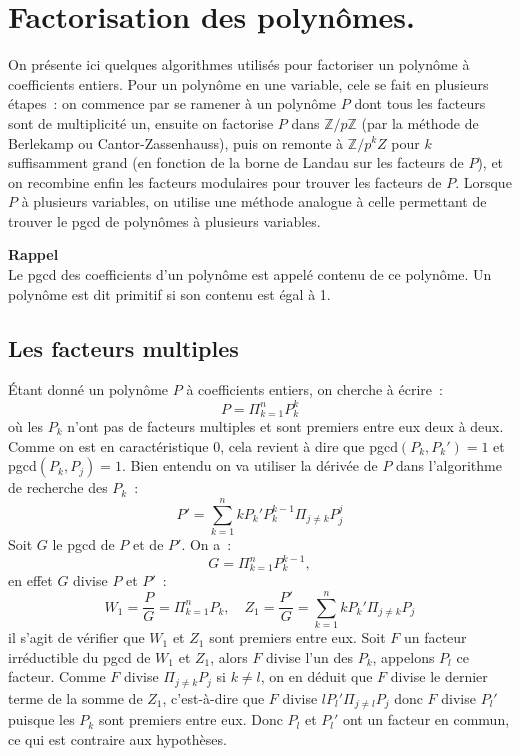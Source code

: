 \documentclass[a4paper,11pt]{article}
\newcommand{\Z}{{\mathbb{Z}}}
\begin{document}
\section{Factorisation des polynômes.} \label{sec:factor}

On présente ici quelques algorithmes utilisés pour factoriser un polynôme 
à coefficients entiers. 
Pour un polynôme en une variable,
cele se fait en plusieurs étapes~: on commence
par se ramener à un polynôme $P$ dont tous les facteurs sont de multiplicité
un, ensuite on factorise $P$ dans $\Z/p\Z$ (par la méthode de Berlekamp
ou Cantor-Zassenhauss), puis on remonte à $\Z/p^k Z$
pour $k$ suffisamment grand (en fonction de la borne de Landau sur les
facteurs de $P$), et on recombine enfin les facteurs modulaires pour
trouver les facteurs de $P$. Lorsque $P$ à plusieurs variables, on utilise
une méthode analogue à celle permettant de trouver le pgcd de polynômes
à plusieurs variables. 

{\bf Rappel}\\
Le pgcd des coefficients d'un polynôme est appelé contenu de ce polynôme.
Un polynôme est dit primitif si son contenu est égal à 1.

\subsection{Les facteurs multiples}  
\'Etant donné un polynôme $P$ à coefficients entiers, on cherche à 
écrire~:
\[ P=\Pi_{k=1}^n P_k^k \]
où les $P_k$ n'ont pas de facteurs multiples et sont premiers entre
eux deux à deux. Comme on est en
caractéristique 0, cela revient à dire que pgcd$(P_k,P_k')=1$
et pgcd$(P_k,P_j)=1$. Bien entendu
on va utiliser la dérivée de $P$ dans l'algorithme de recherche des $P_k$~:
\[ P'=\sum_{k=1}^n kP_k' P_k^{k-1} \Pi_{j\neq k} P_j^j \]
Soit $G$ le pgcd de $P$ et de $P'$. On a~:
\[ G=\Pi_{k=1}^n P_k^{k-1}, \]
en effet $G$ divise $P$ et $P'$~:
\[ W_1=\frac{P}{G}=\Pi_{k=1}^n P_k, \quad 
Z_1=\frac{P'}{G}=\sum_{k=1}^n kP_k'\Pi_{j\neq k} P_j \]
il s'agit de vérifier que $W_1$ et $Z_1$ sont premiers entre eux. Soit $F$ un
facteur irréductible du pgcd de $W_1$ et $Z_1$, alors $F$ divise l'un des 
$P_k$,
appelons $P_l$ ce facteur. Comme $F$ divise $\Pi_{j\neq k} P_j$ si $k\neq l$,
on en déduit que $F$ divise le dernier terme de la somme de $Z_1$, c'est-à-dire
que $F$ divise $lP_l'\Pi_{j\neq l} P_j$ donc $F$ divise $P_l'$ puisque
les $P_k$ sont premiers entre eux. Donc $P_l$ et $P_l'$ ont un facteur
en commun, ce qui est contraire aux hypothèses.
\end{document}
